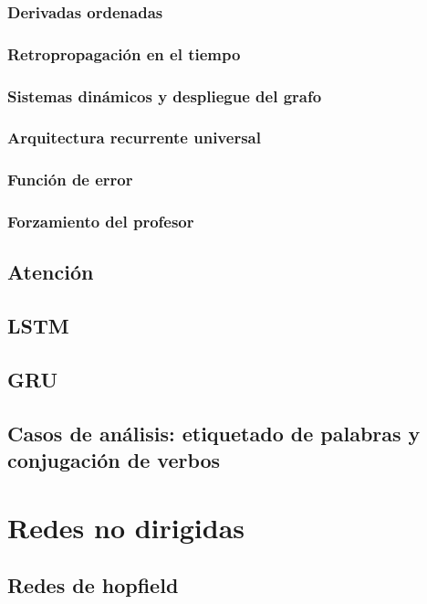 \documentclass[12pt,openany]{book}
\begin{document}
\section{Derivadas ordenadas}
\section{Retropropagación en el tiempo}
\section{Sistemas dinámicos y despliegue del grafo}
\section{Arquitectura recurrente universal}
\section{Función de error}
\section{Forzamiento del profesor}

\chapter{Atención}
\chapter{LSTM}
\chapter{GRU}
\chapter{Casos de análisis: etiquetado de palabras y conjugación de verbos}

\part{Redes no dirigidas}
\chapter{Redes de hopfield}
\end{document}
